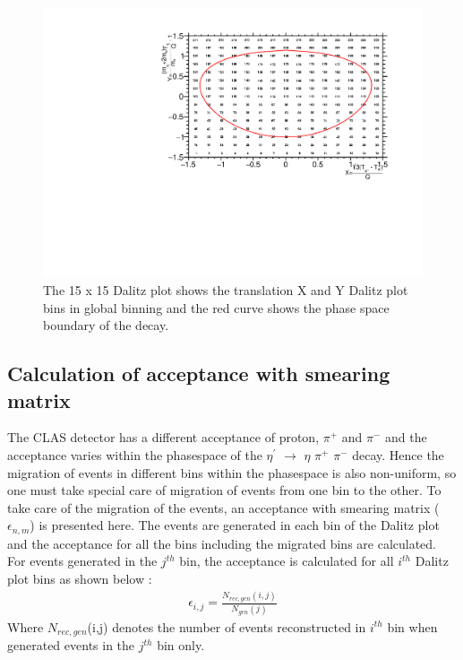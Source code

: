  
\begin{figure}[ht!]
\centerline{
\includegraphics[width=14cm,height=8cm]{gb.pdf}}
\caption{The 15 x 15 Dalitz plot shows the translation X and Y Dalitz plot bins in global binning and the red curve shows the phase space boundary of the decay. }
\label{fig10}
\end{figure} 


\subsection{Calculation of acceptance with smearing matrix}

The CLAS detector has a different acceptance of proton, $\pi^{+}$ and $\pi^{-}$ and the acceptance varies within the phasespace of the  $\eta^{\prime}$ $\rightarrow$ $\eta$ $\pi^{+}$ $\pi^{-}$ decay. Hence the migration of events in different bins within the phasespace is also non-uniform, so one must take special care of migration of events from one bin to the other. To take care of the migration of the events,  an acceptance with smearing matrix ($\epsilon_{n,m}$) is presented here. The events are generated in each bin of the Dalitz plot and the acceptance for all the bins including the migrated bins are calculated. For events generated in the $j^{th}$ bin, the acceptance is calculated for all $i^{th}$ Dalitz plot bins as shown below :
\begin{eqnarray}
\epsilon_{i,j} = \frac{N_{rec,gen}(i,j)}{N_{gen}(j)}
\end{eqnarray}
Where $N_{rec,gen}$(i,j) denotes the number of events reconstructed in $i^{th}$ bin when generated events in the $j^{th}$ bin only.


